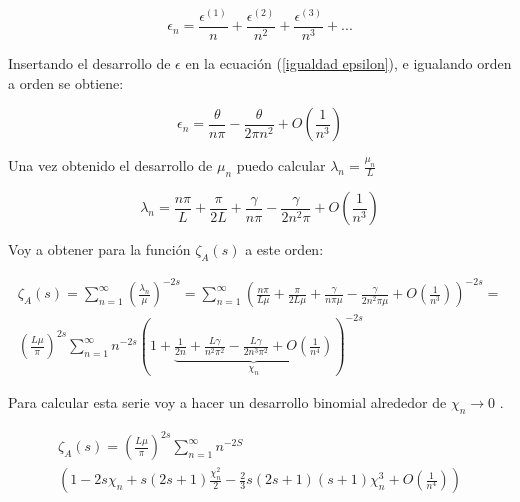 \begin{equation}
    \epsilon _n = 
    \frac{\epsilon ^{(1)}}{n}  + 
    \frac{\epsilon ^{(2)}}{n ^2}  + 
    \frac{\epsilon ^{(3)}}{n ^3}  + ...
\label{eq.epsilon}
\end{equation}


Insertando el desarrollo de $\epsilon$ en la ecuación (\ref{igualdad epsilon}), e igualando orden a orden se obtiene:

\begin{equation}
    \epsilon _n = \frac{\theta}{n \pi} 
     - \frac{ \theta}{2 \pi n ^2 } + O \left( \frac{1}{n ^3}\right)
\label{epsilons}
\end{equation}

Una vez obtenido el desarrollo de $\mu _n $ puedo calcular $\lambda _n = \frac{\mu _n }{L}  $ 



\begin{equation}
    \lambda _n = 
	\frac{n \pi}{L} + 
    \frac{\pi}{2 L} +
    \frac{\gamma}{n \pi} -
    \frac{\gamma}{2 n ^2 \pi} +
    O \left(  \frac{1}{n^3} \right) 
\end{equation}
    
Voy a obtener para la función $ \zeta _A (s)$ a este orden:
    
\begin{equation}
\begin{array}{cc}
    \zeta _{A} (s) =  
    \sum _{n=1} ^{\infty} 
    \left( \frac{\lambda _n }{\mu} 
    	\right) ^ {-2 s}  =
    \sum _{n=1} ^{\infty} 
    \left(
	\frac{n \pi}{L \mu} + 
    \frac{\pi}{2 L \mu} +
    \frac{\gamma}{n \pi \mu } -
    \frac{\gamma}{2 n ^2 \pi \mu } +
    O \left(  \frac{1}{n^3} \right) 
    \right) ^{-2 s} = \\
    ( \frac{L \mu }{\pi} ) ^{2s}    
    \sum _{n=1} ^{\infty} 
    n ^{- 2 s} 
    \left(
    1 +     
    \underbrace{
        \frac{1}{2 n} + 
        \frac{L \gamma}{n^2 \pi ^2} -
        \frac{L \gamma}{2 n ^3 \pi ^2} +
        O(\frac{1}{n ^{4}} ) } _{ \chi _n}
    \right ) ^{-2 s}
\end{array}
\end{equation}

Para calcular esta serie voy a hacer un desarrollo binomial alrededor de $\chi _n \rightarrow{0} $  .

\begin{equation}
\begin{array}{c}
\zeta _{A} (s) = 
( \frac{L \mu }{\pi} ) ^{2s}
\sum _{n=1} ^{\infty}
  n  ^{-2 S} \\
(
	1 - 
	2 s \chi _n +  s(2s+1) \frac{\chi _n ^2}{2} - 
	\frac{2}{3} s(2s+1)(s+1) \chi _n ^3  + O( \frac{1}{n ^4}) )

\end{array}
\end{equation}

